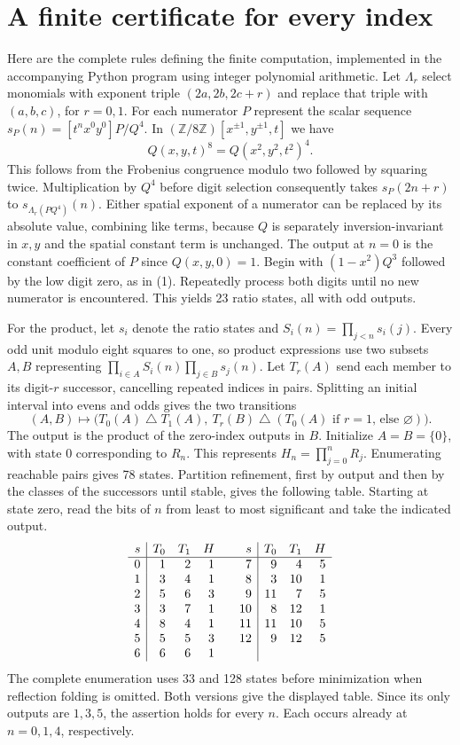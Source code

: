 \documentclass[11pt]{article}
\begin{document}
\section{A finite certificate for every index}
Here are the complete rules defining the finite computation, implemented in the accompanying Python program using integer polynomial arithmetic. Let $\Lambda_r$ select monomials with exponent triple $(2a,2b,2c+r)$ and replace that triple with $(a,b,c)$, for $r=0,1$. For each numerator $P$ represent the scalar sequence $s_P(n)=[t^nx^0y^0]P/Q^4$. In $(\mathbb Z/8\mathbb Z)[x^{\pm1},y^{\pm1},t]$ we have
\[
 Q(x,y,t)^8=Q(x^2,y^2,t^2)^4.
\]
This follows from the Frobenius congruence modulo two followed by squaring twice. Multiplication by $Q^4$ before digit selection consequently takes $s_P(2n+r)$ to $s_{\Lambda_r(PQ^4)}(n)$. Either spatial exponent of a numerator can be replaced by its absolute value, combining like terms, because $Q$ is separately inversion-invariant in $x,y$ and the spatial constant term is unchanged. The output at $n=0$ is the constant coefficient of $P$ since $Q(x,y,0)=1$. Begin with $(1-x^2)Q^3$ followed by the low digit zero, as in (1). Repeatedly process both digits until no new numerator is encountered. This yields 23 ratio states, all with odd outputs.

For the product, let $s_i$ denote the ratio states and $S_i(n)=\prod_{j<n}s_i(j)$. Every odd unit modulo eight squares to one, so product expressions use two subsets $A,B$ representing $\prod_{i\in A}S_i(n)\prod_{j\in B}s_j(n)$. Let $T_r(A)$ send each member to its digit-$r$ successor, cancelling repeated indices in pairs. Splitting an initial interval into evens and odds gives the two transitions
\[
 (A,B)\longmapsto
 \big(T_0(A)\mathbin\triangle T_1(A),\ 
 T_r(B)\mathbin\triangle (T_0(A)\text{ if }r=1\text{, else }\varnothing)\big).
\]
The output is the product of the zero-index outputs in $B$. Initialize $A=B=\{0\}$, with state 0 corresponding to $R_n$. This represents $H_n=\prod_{j=0}^n R_j$. Enumerating reachable pairs gives 78 states. Partition refinement, first by output and then by the classes of the successors until stable, gives the following table. Starting at state zero, read the bits of $n$ from least to most significant and take the indicated output.
\[
\begin{array}{r|rrr@{\hskip20pt}r|rrr}
s&T_0&T_1&H&s&T_0&T_1&H\\\hline
0&1&2&1&7&9&4&5\\
1&3&4&1&8&3&10&1\\
2&5&6&3&9&11&7&5\\
3&3&7&1&10&8&12&1\\
4&8&4&1&11&11&10&5\\
5&5&5&3&12&9&12&5\\
6&6&6&1&&&&
\end{array}
\]
The complete enumeration uses 33 and 128 states before minimization when reflection folding is omitted. Both versions give the displayed table. Since its only outputs are $1,3,5$, the assertion holds for every $n$. Each occurs already at $n=0,1,4$, respectively.
\end{document}

